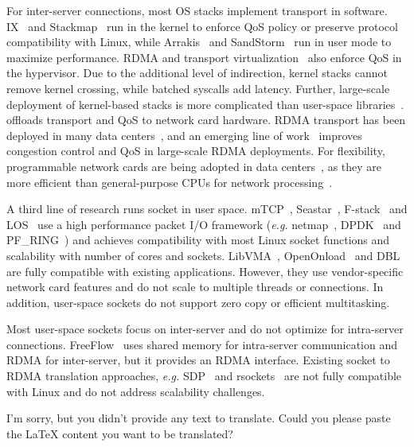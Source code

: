 For inter-server connections, most OS stacks implement transport in software. IX~\cite{belay2017ix} and Stackmap~\cite{yasukata2016stackmap} run in the kernel to enforce QoS policy or preserve protocol compatibility with Linux, while Arrakis~\cite{peter2016arrakis} and SandStorm~\cite{marinos2014network} run in user mode to maximize performance.
RDMA and transport virtualization~\cite{tsai2017lite,niu2017network} also enforce QoS in the hypervisor.
Due to the additional level of indirection, kernel stacks cannot remove kernel crossing, while batched syscalls add latency.
Further, large-scale deployment of kernel-based stacks is more complicated than user-space libraries~\cite{andromeda}.
\sys offloads transport and QoS to network card hardware.
RDMA transport has been deployed in many data centers~\cite{guo2016rdma}, and an emerging line of work~\cite{zhu2015congestion,lu2017memory,mprdma} improves congestion control and QoS in large-scale RDMA deployments.
For flexibility, programmable network cards are being adopted in data centers~\cite{smartnic,cavium}, as they are more efficient than general-purpose CPUs for network processing~\cite{kaufmann2015flexnic,li2016clicknp}.

A third line of research runs socket in user space.
mTCP~\cite{jeong2014mtcp}, Seastar~\cite{seastar}, 
F-stack~\cite{fstack} and LOS~\cite{huang2017high} use a high performance packet I/O framework (\textit{e.g.} netmap~\cite{rizzo2012netmap}, DPDK~\cite{dpdk} and PF\_RING~\cite{pf-ring}) and achieves compatibility with most Linux socket functions and scalability with number of cores and sockets.
LibVMA~\cite{libvma}, OpenOnload~\cite{openonload} and DBL~\cite{dbl} are fully compatible with existing applications. However, they use vendor-specific network card features and do not scale to multiple threads or connections.
In addition, user-space sockets do not support zero copy or efficient multitasking.

Most user-space sockets focus on inter-server and do not optimize for intra-server connections.
FreeFlow~\cite{freeflow} uses shared memory for intra-server communication and RDMA for inter-server, but it provides an RDMA interface.
Existing socket to RDMA translation approaches, \textit{e.g.} SDP~\cite{socketsdirect} and rsockets~\cite{rsockets} are not fully compatible with Linux and do not address scalability challenges.

I'm sorry, but you didn't provide any text to translate. Could you please paste the LaTeX content you want to be translated?
